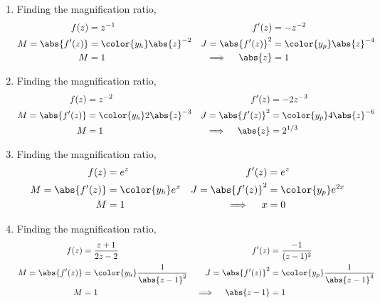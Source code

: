 \begin{enumerate}
    \item Finding the magnification ratio,
          \begin{align}
              f(z)                   & = z^{-1}                   &
              f'(z)                  & = -z^{-2}                    \\
              M = \abs{f'(z)}        & = \color{y_h} \abs{z}^{-2} &
              J = \abs{f'(z)}^2      & = \color{y_p} \abs{z}^{-4}   \\
              M                      & = 1                        &
              \implies \quad \abs{z} & = 1
          \end{align}

    \item Finding the magnification ratio,
          \begin{align}
              f(z)                   & = z^{-2}                    &
              f'(z)                  & = -2z^{-3}                    \\
              M = \abs{f'(z)}        & = \color{y_h} 2\abs{z}^{-3} &
              J = \abs{f'(z)}^2      & = \color{y_p} 4\abs{z}^{-6}   \\
              M                      & = 1                         &
              \implies \quad \abs{z} & = 2^{1/3}
          \end{align}

    \item Finding the magnification ratio,
          \begin{align}
              f(z)              & = e^z                &
              f'(z)             & = e^z                  \\
              M = \abs{f'(z)}   & = \color{y_h} e^x    &
              J = \abs{f'(z)}^2 & = \color{y_p} e^{2x}   \\
              M                 & = 1                  &
              \implies \quad x  & = 0
          \end{align}

    \item Finding the magnification ratio,
          \begin{align}
              f(z)                     & = \frac{z+1}{2z - 2}                &
              f'(z)                    & = \frac{-1}{(z - 1)^2}                \\
              M = \abs{f'(z)}          & = \color{y_h} \frac{1}{\abs{z-1}^2} &
              J = \abs{f'(z)}^2        & = \color{y_p} \frac{1}{\abs{z-1}^4}   \\
              M                        & = 1                                 &
              \implies \quad \abs{z-1} & = 1
          \end{align}


\end{enumerate}
